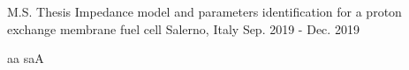 

\begin{cventries}

  \cventry
    {M.S. Thesis}
    {Impedance model and parameters identification for a proton exchange membrane fuel cell}
    {Salerno, Italy}
    {Sep. 2019 - Dec. 2019}
    {
      \begin{cvitems} %
        \item {aa saA}
      \end{cvitems}
    }
\end{cventries}
